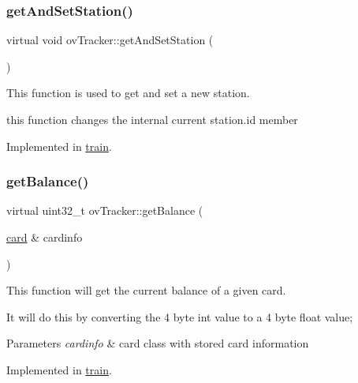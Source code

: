 \subsubsection{\texorpdfstring{get\+And\+Set\+Station()}{getAndSetStation()}}
{\footnotesize\ttfamily virtual void ov\+Tracker\+::get\+And\+Set\+Station (\begin{DoxyParamCaption}{ }\end{DoxyParamCaption})\hspace{0.3cm}{\ttfamily [pure virtual]}}



This function is used to get and set a new station. 

this function changes the internal current station.\+id member 

Implemented in \hyperlink{classtrain_a76824298a986f6a897b3e7cba2c8f15d}{train}.

\mbox{\label{classovTracker_a9bcfc435593679ec503a48da21d7a5a0}} 
\subsubsection{\texorpdfstring{get\+Balance()}{getBalance()}}
{\footnotesize\ttfamily virtual uint32\+\_\+t ov\+Tracker\+::get\+Balance (\begin{DoxyParamCaption}\item[{\hyperlink{classcard}{card} \&}]{cardinfo }\end{DoxyParamCaption})\hspace{0.3cm}{\ttfamily [pure virtual]}}



This function will get the current balance of a given card. 

It will do this by converting the 4 byte int value to a 4 byte float value; 
\begin{DoxyParams}{Parameters}
{\em cardinfo} & card class with stored card information \\
\hline
\end{DoxyParams}


Implemented in \hyperlink{classtrain_a518b32482f1a5a32cc372b6679644b43}{train}.

\mbox{\label{classovTracker_afda6f161dc45106e43fc5031916fd91a}} 
